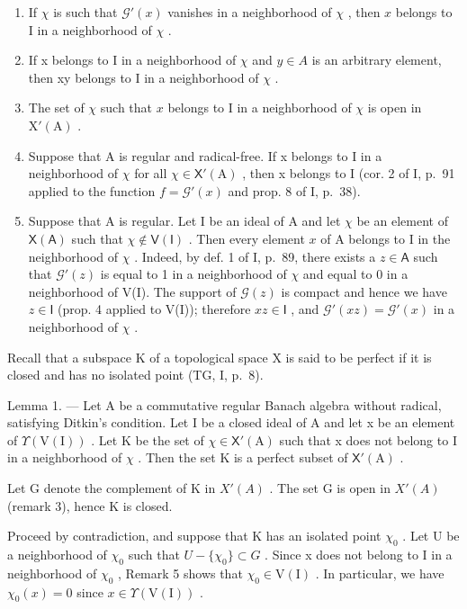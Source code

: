 \begin{enumerate}
\def\labelenumi{\arabic{enumi})}
\item
  If \(\chi\) is such that \(\mathcal{G}'(x)\) vanishes in a neighborhood of \(\chi\) , then \(x\) belongs to I in a neighborhood of \(\chi\) .
\item
  If x belongs to I in a neighborhood of \(\chi\) and \(y \in A\) is an arbitrary element, then xy belongs to I in a neighborhood of \(\chi\) .
\item
  The set of \(\chi\) such that \(x\) belongs to I in a neighborhood of \(\chi\) is open in \(\mathrm{X}'(\mathrm{A})\) .
\item
  Suppose that A is regular and radical-free. If x belongs to I in a neighborhood of \(\chi\) for all \(\chi \in \mathsf{X}'(\mathrm{A})\) , then x belongs to I (cor. 2 of I, p.~91 applied to the function \(f = \mathcal{G}'(x)\) and prop. 8 of I, p.~38).
\item
  Suppose that A is regular. Let I be an ideal of A and let \(\chi\) be an element of \(\mathsf{X}(\mathsf{A})\) such that \(\chi\notin\mathsf{V}(\mathsf{I})\) . Then every element \(x\) of A belongs to I in the neighborhood of \(\chi\) . Indeed, by def. 1 of I, p.~89, there exists a \(z\in\mathsf{A}\) such that \(\mathcal{G}'(z)\) is equal to 1 in a neighborhood of \(\chi\) and equal to 0 in a neighborhood of V(I). The support of \(\mathcal{G}(z)\) is compact and hence we have \(z\in\mathsf{I}\) (prop. 4 applied to V(I)); therefore \(xz\in\mathsf{I}\) , and \(\mathcal{G}'(xz)=\mathcal{G}'(x)\) in a neighborhood of \(\chi\) .
\end{enumerate}

Recall that a subspace K of a topological space X is said to be perfect if it is closed and has no isolated point (TG, I, p.~8).

Lemma 1. --- Let A be a commutative regular Banach algebra without radical, satisfying Ditkin's condition. Let I be a closed ideal of A and let x be an element of \(\Upsilon(\mathrm{V}(\mathrm{I}))\) . Let K be the set of \(\chi \in \mathsf{X}'(\mathrm{A})\) such that x does not belong to I in a neighborhood of \(\chi\) . Then the set K is a perfect subset of \(\mathsf{X}'(\mathrm{A})\) .

Let G denote the complement of K in \(X'(A)\) . The set G is open in \(X'(A)\) (remark 3), hence K is closed.

Proceed by contradiction, and suppose that K has an isolated point \(\chi_{0}\) . Let U be a neighborhood of \(\chi_{0}\) such that \(U - \{\chi_{0}\}\subset G\) . Since x does not belong to I in a neighborhood of \(\chi_{0}\) , Remark 5 shows that \(\chi_{0}\in\mathrm{V(I)}\) . In particular, we have \(\chi_{0}(x)=0\) since \(x\in\Upsilon(\mathrm{V(I)})\) .

